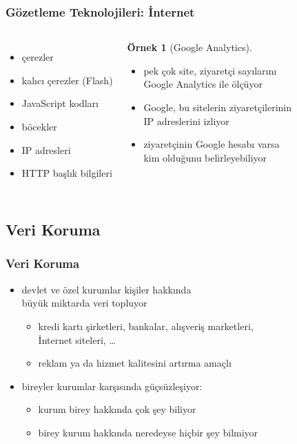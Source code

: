 \documentclass[dvipsnames]{beamer}
\theoremstyle{definition}
\theoremstyle{example}
\newtheorem{ornek}[theorem]{Örnek}
\theoremstyle{plain}
\begin{document}
\begin{frame}
  \frametitle{Gözetleme Teknolojileri: İnternet}

  \begin{columns}
    \begin{itemize}
      \item çerezler
      \item kalıcı çerezler (Flash)
      \item JavaScript kodları
      \item böcekler
      \item IP adresleri
      \item HTTP başlık bilgileri
    \end{itemize}

    \pause
    \begin{ornek}[Google Analytics]
      \begin{itemize}
        \item pek çok site, ziyaretçi sayılarını\\
          Google Analytics ile ölçüyor
        \item Google, bu sitelerin ziyaretçilerinin\\
          IP adreslerini izliyor
        \item ziyaretçinin Google hesabı varsa\\
          kim olduğunu belirleyebiliyor
      \end{itemize}
    \end{ornek}
  \end{columns}
\end{frame}

\subsection{Veri Koruma}

\begin{frame}
  \frametitle{Veri Koruma}

  \begin{itemize}
    \item devlet ve özel kurumlar kişiler hakkında\\
      büyük miktarda veri topluyor
    \begin{itemize}
      \item kredi kartı şirketleri, bankalar, alışveriş marketleri,\\
        İnternet siteleri, \ldots
      \item reklam ya da hizmet kalitesini artırma amaçlı
    \end{itemize}

    \pause
    \medskip
    \item bireyler kurumlar karşısında güçsüzleşiyor:
    \begin{itemize}
      \item kurum birey hakkında çok şey biliyor
      \item birey kurum hakkında neredeyse hiçbir şey bilmiyor
    \end{itemize}
  \end{itemize}
\end{frame}
\end{document}
